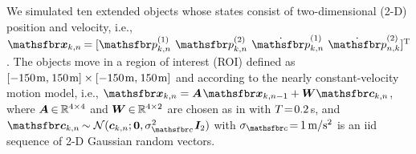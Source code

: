 \documentclass[10pt, twoside, romanappendices]{IEEEtran}
\providecommand{\ist}{\hspace*{.3mm}}
\providecommand{\rmv}{\hspace*{-.3mm}}
\begin{document}
We simulated ten extended objects whose states consist of two-dimensional (2-D) position and velocity, i.e., $\RV{x}_{k,n} \rmv= [\rv{p}^{(1)}_{k,n} \;\ist \rv{p}^{(2)}_{k,n} \;\ist \dot{\rv{p}}^{(1)}_{k,n} \;\ist \dot{\rv{p}}^{(2)}_{n,k}]^{\text{T}}\rmv\rmv$. The objects move in a region of interest (ROI) defined as $[-150\ist\text{m}, \ist 150\ist\text{m} ]  \times [-150\ist\text{m}, \ist 150\ist\text{m}]$ and according to the nearly constant-velocity motion model, i.e., $\RV{x}_{k,n} = \M{A}\ist\RV{x}_{k,n-1} + \M{W}\RV{c}_{k,n}$, where $\M{A} \rmv\in\rmv \mathbb{R}^{4 \times 4}$ and $\M{W} \rmv\in\rmv \mathbb{R}^{4 \times 2}$ are chosen as in \cite[Section 6.3.2]{ShaKirLi:B02} with $T \!=\! 0.2\ist$s, and $\RV{c}_{k,n} \rmv\sim \Set{N}(\V{c}_{k,n};\V{0},\sigma^2_{\rv{c}} \ist \M{I}_2)$ with $\sigma_{\rv{c}} \!=\rmv 1 \ist\ist \text{m}/\text{s}^2$ is an \ac{iid} sequence of 2-D Gaussian random vectors. 
\end{document}
